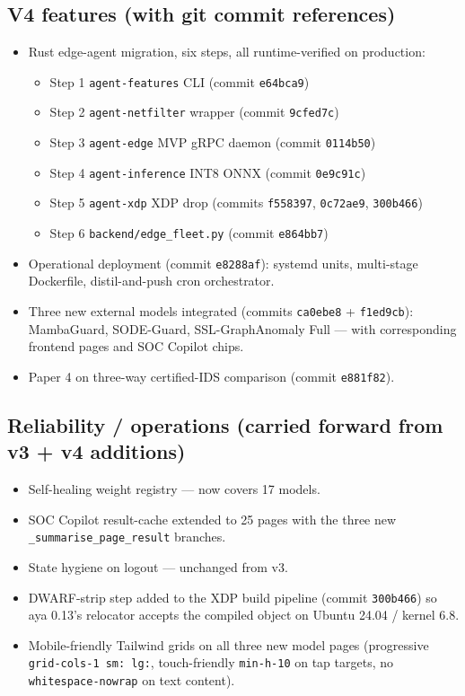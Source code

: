 \documentclass[11pt,a4paper]{article}
\begin{document}
\subsection*{V4 features (with git commit references)}
\begin{itemize}[nosep]
  \item Rust edge-agent migration, six steps, all runtime-verified
        on production:
    \begin{itemize}[nosep]
      \item Step 1 \texttt{agent-features} CLI (commit \texttt{e64bca9})
      \item Step 2 \texttt{agent-netfilter} wrapper (commit \texttt{9cfed7c})
      \item Step 3 \texttt{agent-edge} MVP gRPC daemon (commit \texttt{0114b50})
      \item Step 4 \texttt{agent-inference} INT8 ONNX (commit \texttt{0e9c91c})
      \item Step 5 \texttt{agent-xdp} XDP drop (commits \texttt{f558397}, \texttt{0c72ae9}, \texttt{300b466})
      \item Step 6 \texttt{backend/edge\_fleet.py} (commit \texttt{e864bb7})
    \end{itemize}
  \item Operational deployment (commit \texttt{e8288af}): systemd
        units, multi-stage Dockerfile, distil-and-push cron
        orchestrator.
  \item Three new external models integrated (commits \texttt{ca0ebe8}
        + \texttt{f1ed9cb}): MambaGuard, SODE-Guard, SSL-GraphAnomaly
        Full --- with corresponding frontend pages and SOC Copilot
        chips.
  \item Paper 4 on three-way certified-IDS comparison
        (commit \texttt{e881f82}).
\end{itemize}

\subsection*{Reliability / operations (carried forward from v3 +
              v4 additions)}
\begin{itemize}[nosep]
  \item Self-healing weight registry --- now covers 17 models.
  \item SOC Copilot result-cache extended to 25 pages with the three
        new \texttt{\_summarise\_page\_result} branches.
  \item State hygiene on logout --- unchanged from v3.
  \item DWARF-strip step added to the XDP build pipeline (commit
        \texttt{300b466}) so aya 0.13's relocator accepts the
        compiled object on Ubuntu 24.04 / kernel 6.8.
  \item Mobile-friendly Tailwind grids on all three new model pages
        (progressive \texttt{grid-cols-1 sm: lg:}, touch-friendly
        \texttt{min-h-10} on tap targets, no \texttt{whitespace-nowrap}
        on text content).
\end{itemize}
\end{document}
